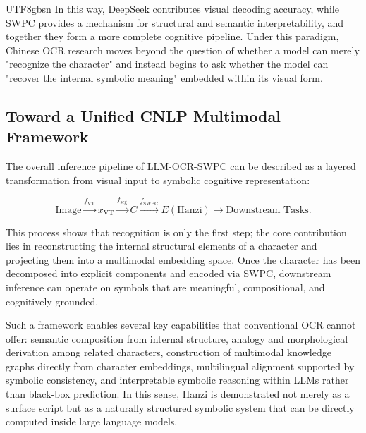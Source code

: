 \documentclass[conference]{IEEEtran}
\begin{document}
\begin{CJK*}{UTF8}{gbsn}
In this way, DeepSeek contributes visual decoding accuracy, while SWPC provides a mechanism for structural and semantic interpretability, and together they form a more complete cognitive pipeline. Under this paradigm, Chinese OCR research moves beyond the question of whether a model can merely "recognize the character" and instead begins to ask whether the model can "recover the internal symbolic meaning" embedded within its visual form.

\subsection{Toward a Unified CNLP Multimodal Framework}

The overall inference pipeline of LLM-OCR-SWPC can be described as a layered
transformation from visual input to symbolic cognitive representation:

\[
\text{Image} 
\stackrel{f_{\mathrm{VT}}}{\longrightarrow} x_{\mathrm{VT}}
\stackrel{f_{\mathrm{seg}}}{\longrightarrow} C
\stackrel{f_{\mathrm{SWPC}}}{\longrightarrow} E(\text{Hanzi})
\longrightarrow \text{Downstream Tasks}.
\]


This process shows that recognition is only the first step; the core contribution lies in reconstructing the internal structural elements of a character and projecting them into a multimodal embedding space. Once the character has been decomposed into explicit components and encoded via SWPC, downstream inference can operate on symbols that are meaningful, compositional, and cognitively grounded.

Such a framework enables several key capabilities that conventional OCR cannot offer: semantic composition from internal structure, analogy and morphological derivation among related characters, construction of multimodal knowledge graphs directly from character embeddings, multilingual alignment supported by symbolic consistency, and interpretable symbolic reasoning within LLMs rather than black-box prediction. In this sense, Hanzi is demonstrated not merely as a surface script but as a naturally structured symbolic system that can be directly computed inside large language models.


\end{CJK*}
\end{document}
